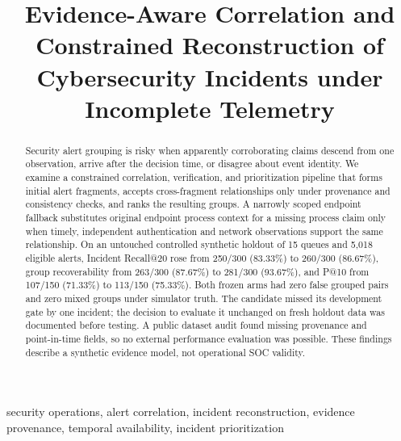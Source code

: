 \documentclass[conference]{IEEEtran}
\begin{document}
\title{Evidence-Aware Correlation and Constrained Reconstruction of Cybersecurity Incidents under Incomplete Telemetry}
\author{
}
\maketitle
\begin{abstract}
Security alert grouping is risky when apparently corroborating claims descend from one observation, arrive after the decision time, or disagree about event identity. We examine a constrained correlation, verification, and prioritization pipeline that forms initial alert fragments, accepts cross-fragment relationships only under provenance and consistency checks, and ranks the resulting groups. A narrowly scoped endpoint fallback substitutes original endpoint process context for a missing process claim only when timely, independent authentication and network observations support the same relationship. On an untouched controlled synthetic holdout of 15 queues and 5,018 eligible alerts, Incident Recall@20 rose from 250/300 (83.33\%) to 260/300 (86.67\%), group recoverability from 263/300 (87.67\%) to 281/300 (93.67\%), and P@10 from 107/150 (71.33\%) to 113/150 (75.33\%). Both frozen arms had zero false grouped pairs and zero mixed groups under simulator truth. The candidate missed its development gate by one incident; the decision to evaluate it unchanged on fresh holdout data was documented before testing. A public dataset audit found missing provenance and point-in-time fields, so no external performance evaluation was possible. These findings describe a synthetic evidence model, not operational SOC validity.
\end{abstract}
\begin{IEEEkeywords}
security operations, alert correlation, incident reconstruction, evidence provenance, temporal availability, incident prioritization
\end{IEEEkeywords}















\appendices


\end{document}
